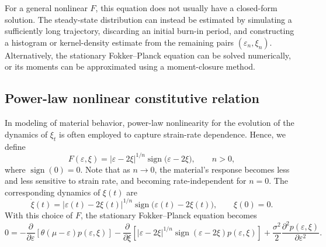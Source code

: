 \documentclass[11pt]{article}
\begin{document}
For a general nonlinear $F$, this equation does not usually have a closed-form
solution. The steady-state distribution can instead be estimated by simulating
a sufficiently long trajectory, discarding an initial burn-in period, and
constructing a histogram or kernel-density estimate from the remaining pairs
$(\varepsilon_n,\xi_n)$. Alternatively, the stationary Fokker--Planck equation can be
solved numerically, or its moments can be approximated using a moment-closure
method.

\subsection{Power-law nonlinear constitutive relation}
In modeling of material behavior, power-law nonlinearity for the evolution of the dynamics of $\xi_t$ is often employed to capture strain-rate dependence. Hence, we define
\begin{equation}
    F(\varepsilon,\xi)
    =\left|\varepsilon-2\xi\right|^{1/n}
    \operatorname{sign}\bigl(\varepsilon-2\xi\bigr),
    \qquad n>0,
\end{equation}
where $\operatorname{sign}(0)=0$. Note that as $n\to 0$, the material's response becomes less and less sensitive to strain rate, and becoming rate-independent for $n=0$. The corresponding dynamics of $\xi(t)$ are
\begin{equation}
    \dot{\xi}(t)
    =\left|\varepsilon(t)-2\xi(t)\right|^{1/n}
    \operatorname{sign}\bigl(\varepsilon(t)-2\xi(t)\bigr),
    \qquad \xi(0)=0.
\end{equation}
With this choice of $F$, the stationary Fokker--Planck equation becomes
\begin{equation}
    0=-\frac{\partial}{\partial\varepsilon}
    \left[\theta(\mu-\varepsilon)p(\varepsilon,\xi)\right]
    -\frac{\partial}{\partial\xi}
    \left[
    |\varepsilon-2\xi|^{1/n}
    \operatorname{sign}(\varepsilon-2\xi)
    p(\varepsilon,\xi)
    \right]
    +\frac{\sigma^2}{2}
    \frac{\partial^2p(\varepsilon,\xi)}{\partial\varepsilon^2}.
\end{equation}
\end{document}
